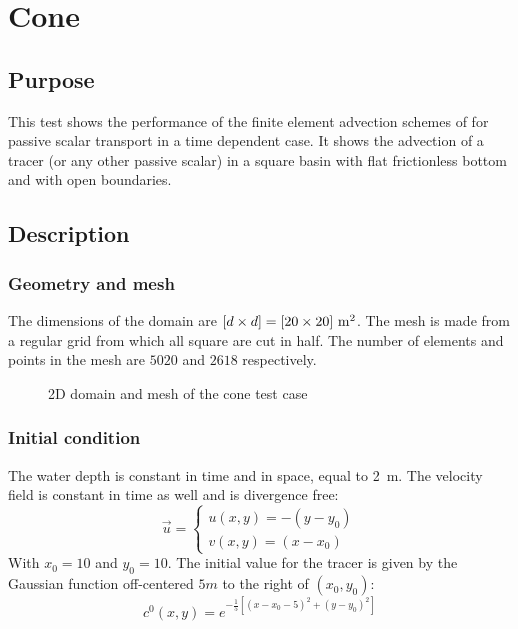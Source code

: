 \chapter{Cone}
%


\section{Purpose}
This test shows the performance of the finite element advection schemes of  for passive scalar transport in a time dependent case. 
It shows the advection of a tracer (or any other passive scalar) in a square basin with flat frictionless bottom and with open boundaries. 

\section{Description}

\subsection{Geometry and mesh}

The dimensions of the domain are $[d \times d]=[20 \times 20]~\rm{m}^2$.
The mesh is made from a regular grid from which all square are cut in half.
The number of elements and points in the mesh are $5020$ and $2618$ respectively.

\begin{figure}[h!]
\centering
{}
\caption{2D domain and mesh of the cone test case}
\label{t2d:cone:mesh}
\end{figure}

\subsection{Initial condition}

The water depth is constant in time and in space, equal to 2~m. The velocity field is constant in time as well and is divergence free:
\begin{equation*}
  \vec{u}=\left\{
         \begin{array}{l}
          u(x,y)=-(y-y_0) \\
          v(x,y)=(x-x_0)
         \end{array}\right.
\end{equation*}
With $x_0=10$ and $y_0=10$. The initial value for the tracer is given by the Gaussian function
off-centered $5m$ to the right of $(x_0, y_0)$:
\begin{equation*}
c^0(x,y)=e^{-\frac{1}{5}[(x-x_0-5)^2+(y-y_0)^2]}
\end{equation*}

